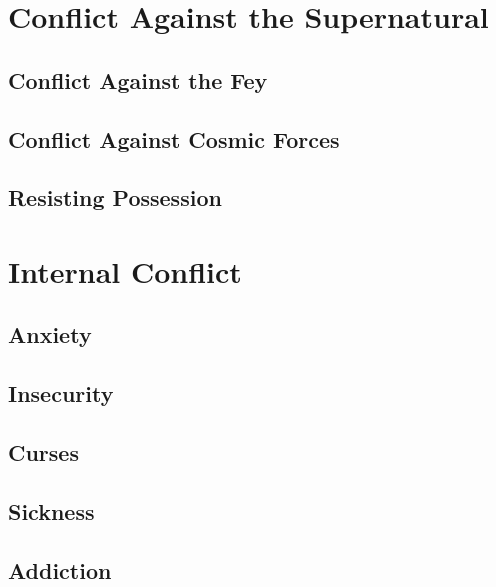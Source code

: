 \documentclass[twocolumn]{dndbook}
\begin{document}
\chapter{Conflict Against the Supernatural}
\section{Conflict Against the Fey}

\section{Conflict Against Cosmic Forces}

\section{Resisting Possession}



\chapter{Internal Conflict}
\section{Anxiety}
\section{Insecurity}
\section{Curses}
\section{Sickness}
\section{Addiction}
\end{document}
